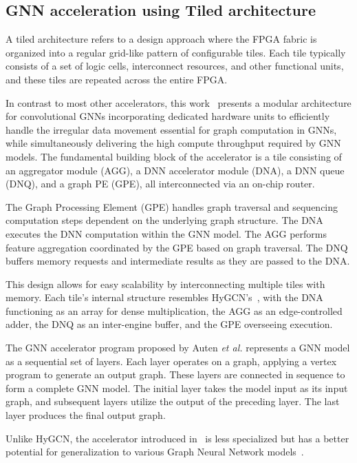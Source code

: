 \subsection{GNN acceleration using Tiled architecture}
\label{subsec:tiled-architectures}

A tiled architecture refers to a design approach where the FPGA fabric is organized into a regular grid-like pattern of configurable tiles.
Each tile typically consists of a set of logic cells, interconnect resources, and other functional units, and these tiles are repeated across the entire FPGA.

In contrast to most other accelerators, this work~\cite{9218751} presents a modular architecture for convolutional GNNs incorporating dedicated hardware units to efficiently handle the irregular data movement essential for graph computation in GNNs, while simultaneously delivering the high compute throughput required by GNN models.
The fundamental building block of the accelerator is a tile consisting of an aggregator module (AGG), a DNN accelerator module (DNA), a DNN queue (DNQ), and a graph PE (GPE), all interconnected via an on-chip router.

The Graph Processing Element (GPE) handles graph traversal and sequencing computation steps dependent on the underlying graph structure.
The DNA executes the DNN computation within the GNN model.
The AGG performs feature aggregation coordinated by the GPE based on graph traversal.
The DNQ buffers memory requests and intermediate results as they are passed to the DNA.

This design allows for easy scalability by interconnecting multiple tiles with memory.
Each tile's internal structure resembles HyGCN's~\cite{DBLP:journals/corr/abs-2010-00130}, with the DNA functioning as an array for dense multiplication, the AGG as an edge-controlled adder, the DNQ as an inter-engine buffer, and the GPE overseeing execution.

The GNN accelerator program proposed by Auten \textit{et al.} represents a GNN model as a sequential set of layers.
Each layer operates on a graph, applying a vertex program to generate an output graph.
These layers are connected in sequence to form a complete GNN model.
The initial layer takes the model input as its input graph, and subsequent layers utilize the output of the preceding layer.
The last layer produces the final output graph.

Unlike HyGCN, the accelerator introduced in~\cite{9218751} is less specialized but has a better potential for generalization to various Graph Neural Network models~\cite{DBLP:journals/corr/abs-2010-00130}.

